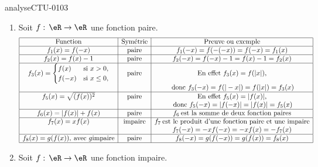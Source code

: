 
\begin{corrige}{analyseCTU-0103}

  \begin{enumerate}
  \item Soit $f:\,\eR\to\eR$ une fonction paire.
      \begin{equation*}
        \begin{array}{|c|c|c|}
         \hline
         \text{Function} & \text{Sym\'etrie} & \text{Preuve ou exemple}\\
          \hline
            f_1 (x) = f(-x) & \text{paire} & f_1 (-x) = f(-(-x)) = f(-x) = f_1(x) \\
            \hline
            f_2 (x) = f(x)-1 & \text{paire} & f_2 (-x) = f(-x)-1 =f(x)-1 = f_2(x) \\
            \hline
            f_3 (x)= 
            \begin{cases}
              f(x) &\text{si } x>0, \\
              f(-x)& \text{si } x\leq 0,
            \end{cases} &\text{paire} & \text{En effet } f_3(x) = f(|x|),\\
            && \:\text{donc } f_3(-x) = f(|-x|)= f(|x|) = f_3 (x) \\
            \hline
            f_5(x) = \sqrt{(f(x))^2} &\text{paire}& \text{En effet } f_5(x) = |f(x)|,\\
            && \:\text{donc } f_5(-x) = |f(-x)| = |f(x)| = f_5(x)\\
            \hline
            f_6(x)= |f(x)| + f(x) &\text{paire}& f_6 \: \text{est la somme de deux fonction paires} \\
            \hline
            f_7(x) = xf(x)&\text{impaire}& f_7 \: \text{est le produit d'une fonction paire et une impaire} \\
            &&f_7(-x) = -xf(-x) = -xf(x) = -f_7(x)\\
            \hline
            f_8(x) = g(f(x)), \:\text{avec }g \text{impaire} &\text{paire}& f_8(-x) = g(f(-x))= g(f(x))=f_8(x) \\
\hline
        \end{array}
      \end{equation*}
\item  Soit $f:\,\eR\to\eR$ une fonction impaire.
      \begin{equation*}

\end{equation*}
\end{enumerate}
\end{corrige}
